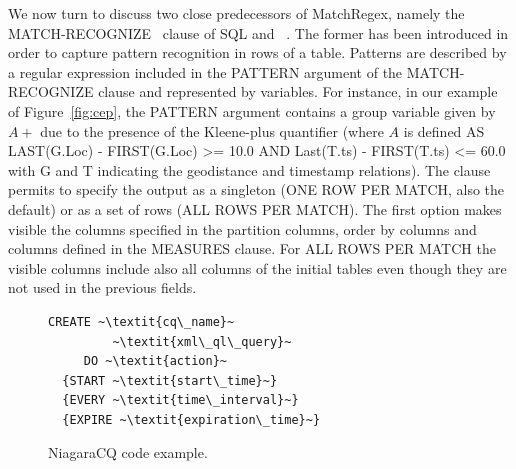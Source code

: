 We now turn to discuss two close predecessors of MatchRegex, namely the MATCH-RECOGNIZE~\cite{zemke_et_al_2007} clause of SQL and 
~\cite{}. The former has been introduced in order to capture pattern recognition in rows of a table. Patterns are described by a regular 
expression included in the PATTERN argument of the MATCH-RECOGNIZE clause and represented by variables. For instance, in our example of Figure~\ref{fig:cep}, the PATTERN argument contains a group variable given by $A+$ due to the presence of the Kleene-plus quantifier (where $A$ is defined AS
LAST(G.Loc) - FIRST(G.Loc) >= 10.0
        AND Last(T.ts) - FIRST(T.ts) <= 60.0 with G and T indicating the geodistance and timestamp relations). The clause permits to specify the output as a singleton (ONE ROW PER MATCH, also the default) or as a set of rows (ALL ROWS PER MATCH). The first option makes visible the columns specified in   the partition
columns, order by columns and columns defined in the MEASURES clause. For ALL
ROWS PER MATCH the visible columns include also all columns of the initial tables even though they are not used in the previous fields.



\begin{figure}[!h]
\begin{lstlisting}
CREATE ~\textit{cq\_name}~
         ~\textit{xml\_ql\_query}~
     DO ~\textit{action}~
  {START ~\textit{start\_time}~}
  {EVERY ~\textit{time\_interval}~}
  {EXPIRE ~\textit{expiration\_time}~}
\end{lstlisting}
\vspace*{-4mm}
\caption{\label{fig:Niagra}NiagaraCQ code example.}
\end{figure}

